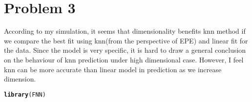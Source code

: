 \documentclass{article}\usepackage[]{graphicx}\usepackage[]{color}
\makeatletter
\newcommand{\hlstd}[1]{\textcolor[rgb]{0.345,0.345,0.345}{#1}}%
\newcommand{\hlkwd}[1]{\textcolor[rgb]{0.737,0.353,0.396}{\textbf{#1}}}%
\newenvironment{kframe}{%
 \def\at@end@of@kframe{}%
 \ifinner\ifhmode%
  \def\at@end@of@kframe{\end{minipage}}%
  \begin{minipage}{\columnwidth}%
 \fi\fi%
 \def\FrameCommand##1{\hskip\@totalleftmargin \hskip-\fboxsep
 \colorbox{shadecolor}{##1}\hskip-\fboxsep
     \hskip-\linewidth \hskip-\@totalleftmargin \hskip\columnwidth}%
 \MakeFramed {\advance\hsize-\width
   \@totalleftmargin\z@ \linewidth\hsize
   \@setminipage}}%
 {\par\unskip\endMakeFramed%
 \at@end@of@kframe}
\newenvironment{knitrout}{}{} %
\makeatother
\begin{document}
\section*{Problem 3}

According to my simulation, it seems that dimensionality benefits knn method if we compare the best fit using knn(from the perspective of EPE) and linear fit for the data. Since the model is very specific, it is hard to draw a general conclusion on the behaviour of knn prediction under high dimensional case. However, I feel knn can be more accurate than linear model in prediction as we increase dimension.
\begin{knitrout}
\color{fgcolor}\begin{kframe}
\begin{alltt}
\hlkwd{library}\hlstd{(FNN)}
\end{alltt}



\end{kframe}
\end{knitrout}
\end{document}
